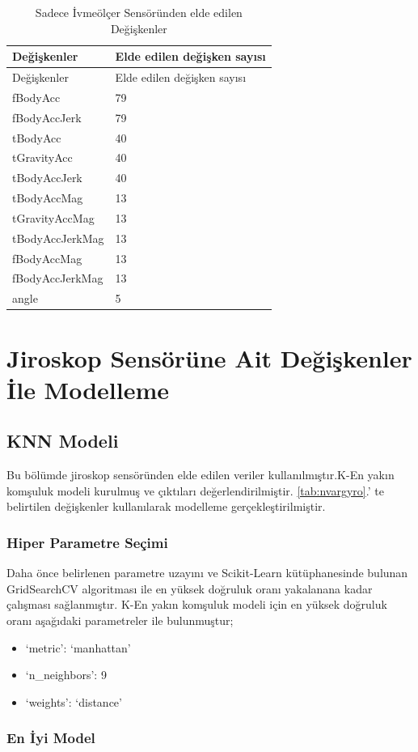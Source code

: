 \documentclass[12pt,twoside]{deuthesis}
\providecommand{\tightlist}{%
  \setlength{\itemsep}{0pt}\setlength{\parskip}{0pt}}
\begin{document}
\begin{longtable}[]{@{}ll@{}}
\caption{\label{tab:nvaracc} Sadece İvmeölçer Sensöründen elde edilen Değişkenler}\tabularnewline
\toprule()
Değişkenler & Elde edilen değişken sayısı \\
\midrule()
\endfirsthead
\toprule()
Değişkenler & Elde edilen değişken sayısı \\
\midrule()
\endhead
fBodyAcc & 79 \\
fBodyAccJerk & 79 \\
tBodyAcc & 40 \\
tGravityAcc & 40 \\
tBodyAccJerk & 40 \\
tBodyAccMag & 13 \\
tGravityAccMag & 13 \\
tBodyAccJerkMag & 13 \\
fBodyAccMag & 13 \\
fBodyAccJerkMag & 13 \\
angle & 5 \\
\bottomrule()
\end{longtable}
\hypertarget{jiroskop-sensuxf6ruxfcne-ait-deux11fiux15fkenler-ile-modelleme}{%
\section{Jiroskop Sensörüne Ait Değişkenler İle Modelleme}\label{jiroskop-sensuxf6ruxfcne-ait-deux11fiux15fkenler-ile-modelleme}}

\hypertarget{knn-modeli}{%
\subsection{KNN Modeli}\label{knn-modeli}}

Bu bölümde jiroskop sensöründen elde edilen veriler kullanılmıştır.K-En yakın komşuluk modeli kurulmuş ve çıktıları değerlendirilmiştir.
\ref{tab:nvargyro}.' te belirtilen değişkenler kullanılarak modelleme gerçekleştirilmiştir.

\hypertarget{hiper-parametre-seuxe7imi}{%
\subsubsection{Hiper Parametre Seçimi}\label{hiper-parametre-seuxe7imi}}

Daha önce belirlenen parametre uzayını ve Scikit-Learn kütüphanesinde bulunan GridSearchCV algoritması ile en yüksek doğruluk oranı yakalanana kadar çalışması sağlanmıştır.
K-En yakın komşuluk modeli için en yüksek doğruluk oranı aşağıdaki parametreler ile bulunmuştur;
\begin{itemize}
\tightlist
\item
  `metric': `manhattan'
\item
  `n\_neighbors': 9
\item
  `weights': `distance'
\end{itemize}
\hypertarget{en-iyi-model}{%
\subsubsection{En İyi Model}\label{en-iyi-model}}
\end{document}
